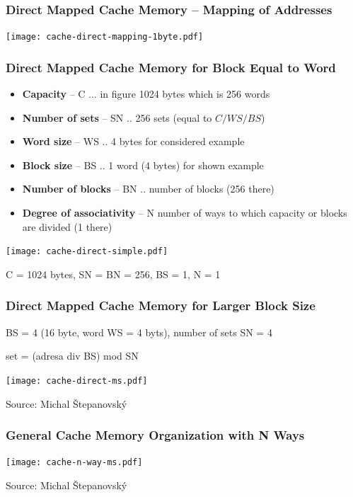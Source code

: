 \documentclass{beamer}
\begin{document}
\begin{frame}
\frametitle{Direct Mapped Cache Memory -- Mapping of Addresses}

{
\centering

\texttt{[image: cache-direct-mapping-1byte.pdf]}

}

\end{frame}

\begin{frame}
\frametitle{Direct Mapped Cache Memory for Block Equal to Word}

\begin{itemize}
\item \textbf{Capacity} -- C ... in figure 1024 bytes which is 256 words
\item \textbf{Number of sets} -- SN .. 256 sets (equal to $C/WS/BS$)
\item \textbf{Word size} – WS .. 4 bytes for considered example
\item \textbf{Block size} – BS .. 1 word (4 bytes) for shown example
\item \textbf{Number of blocks} -- BN .. number of blocks (256 there)
\item \textbf{Degree of associativity} -- N number of ways to which capacity or blocks are divided (1 there)
\end{itemize}

{
\centering

\texttt{[image: cache-direct-simple.pdf]}

}

C = 1024 bytes, SN = BN = 256, BS = 1, N = 1

\end{frame}


\begin{frame}
\frametitle{Direct Mapped Cache Memory for Larger Block Size}

BS = 4 (16 byte, word WS = 4 byts), number of sets SN = 4

set = (adresa div BS) mod SN

{
\centering

\texttt{[image: cache-direct-ms.pdf]}

}

{\tiny Source: Michal Štepanovský}
\end{frame}

\begin{frame}
\frametitle{General Cache Memory Organization with N Ways}

{
\centering

\texttt{[image: cache-n-way-ms.pdf]}

}

{\tiny Source: Michal Štepanovský}

\end{frame}
\end{document}
